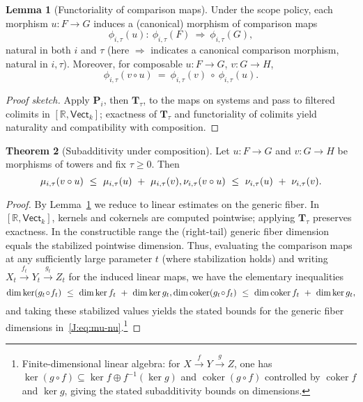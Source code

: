 \documentclass[11pt]{article}
\numberwithin{equation}{section}
\theoremstyle{plain}
\theoremstyle{definition}
\theoremstyle{remark}
\theoremstyle{plain}
\theoremstyle{definition}
\numberwithin{equation}{section}
\newtheorem{theorem}{Theorem}[section]
\newtheorem{lemma}[theorem]{Lemma}
\theoremstyle{definition}
\numberwithin{equation}{section}
\theoremstyle{plain}
\theoremstyle{definition}
\theoremstyle{remark}
\providecommand{\n}{\unskip\space}
\begin{document}
\begin{lemma}[Functoriality of comparison maps]\label{J:lem:functoriality}
Under the scope policy, each morphism \(u:F\to G\) induces a (canonical) morphism of comparison maps
\[
\phi_{i,\tau}(u):\ \phi_{i,\tau}(F)\ \Longrightarrow\ \phi_{i,\tau}(G),
\]
natural in both \(i\) and \(\tau\) (here \(\Longrightarrow\) indicates a canonical comparison morphism, natural in \(i,\tau\)).
Moreover, for composable \(u:F\to G\), \(v:G\to H\),
\[
\phi_{i,\tau}(v\circ u)\ =\ \phi_{i,\tau}(v)\ \circ\ \phi_{i,\tau}(u).
\]
\end{lemma}

\begin{proof}[Proof sketch]
Apply \(\mathbf{P}_i\), then \(\mathbf{T}_\tau\), to the maps on systems and pass to filtered colimits in \([\mathbb{R},\mathsf{Vect}_k]\); exactness of \(\mathbf{T}_\tau\) and functoriality of colimits yield naturality and compatibility with composition.
\end{proof}

\begin{theorem}[Subadditivity under composition]\label{J:thm:subadd}
Let \(u:F\to G\) and \(v:G\to H\) be morphisms of towers and fix \(\tau\ge 0\).
Then
\[
\mu_{i,\tau}(v\circ u)\ \le\ \mu_{i,\tau}(u)\ +\ \mu_{i,\tau}(v),\qquad\n\nu_{i,\tau}(v\circ u)\ \le\ \nu_{i,\tau}(u)\ +\ \nu_{i,\tau}(v).
\]
\end{theorem}

\begin{proof}
By Lemma~\ref{J:lem:functoriality} we reduce to linear estimates on the generic fiber.
In \([\mathbb{R},\mathsf{Vect}_k]\), kernels and cokernels are computed pointwise; applying \(\mathbf{T}_\tau\) preserves exactness.
In the constructible range the (right-tail) generic fiber dimension equals the stabilized pointwise dimension.
Thus, evaluating the comparison maps at any sufficiently large parameter \(t\) (where stabilization holds) and writing \(X_t\xrightarrow{f_t}Y_t\xrightarrow{g_t}Z_t\) for the induced linear maps, we have the elementary inequalities
\[
\dim\ker(g_t\!\circ\! f_t)\ \le\ \dim\ker f_t\ +\ \dim\ker g_t,\qquad\n\dim\operatorname{coker}(g_t\!\circ\! f_t)\ \le\ \dim\operatorname{coker} f_t\ +\ \dim\ker g_t,
\]
and taking these stabilized values yields the stated bounds for the generic fiber dimensions in~\eqref{J:eq:mu-nu}.\footnote{Finite-dimensional linear algebra: for \(X\xrightarrow{f}Y\xrightarrow{g}Z\), one has \(\ker(g\!\circ\! f)\subseteq \ker f \oplus f^{-1}(\ker g)\) and \(\operatorname{coker}(g\!\circ\! f)\) controlled by \(\operatorname{coker} f\) and \(\ker g\), giving the stated subadditivity bounds on dimensions.}
\end{proof}
\end{document}
